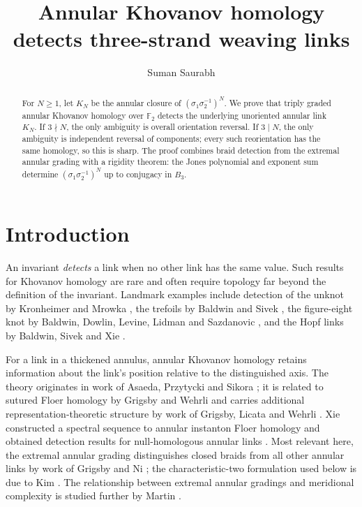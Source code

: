 \documentclass[11pt]{amsart}
\title[Annular Khovanov homology and weaving links]
{Annular Khovanov homology detects three-strand weaving links}
\author{Suman Saurabh}
\theoremstyle{remark}
\begin{document}
\begin{abstract}
For \(N\geq1\), let \(K_N\) be the annular closure of
\((\sigma_1\sigma_2^{-1})^N\).  We prove that triply graded annular Khovanov homology
over \(\mathbb F_2\) detects the underlying unoriented annular link \(K_N\).  If
\(3\nmid N\), the only ambiguity is overall orientation reversal.  If \(3\mid N\),
the only ambiguity is independent reversal of components; every such reorientation
has the same homology, so this is sharp.  The proof combines braid detection from the
extremal annular grading with a rigidity theorem: the Jones polynomial and exponent
sum determine \((\sigma_1\sigma_2^{-1})^N\) up to conjugacy in \(B_3\).
\end{abstract}

\maketitle

\section{Introduction}

An invariant \emph{detects} a link when no other link has the same value.  Such results
for Khovanov homology \cite{Khovanov} are rare and often require topology far beyond
the definition of the invariant.  Landmark examples include detection of the unknot
by Kronheimer and Mrowka \cite{KronheimerMrowka}, the trefoils by Baldwin and Sivek
\cite{BaldwinSivek}, the figure-eight knot by Baldwin, Dowlin, Levine, Lidman and
Sazdanovic \cite{BaldwinDowlinLevineLidmanSazdanovic}, and the Hopf links by Baldwin,
Sivek and Xie \cite{BaldwinSivekXie}.

For a link in a thickened annulus, annular Khovanov homology retains information about
the link's position relative to the distinguished axis.  The theory originates in work
of Asaeda, Przytycki and Sikora \cite{APS}; it is related to sutured Floer homology by
Grigsby and Wehrli \cite{GrigsbyWehrli} and carries additional representation-theoretic
structure by work of Grigsby, Licata and Wehrli \cite{GrigsbyLicataWehrli}.  Xie
constructed a spectral sequence to annular instanton Floer homology and obtained
detection results for null-homologous annular links \cite{Xie}.  Most relevant here,
the extremal annular grading distinguishes closed braids from all other annular links
by work of Grigsby and Ni \cite{GrigsbyNi}; the characteristic-two formulation used
below is due to Kim \cite{Kim}.  The relationship between extremal annular gradings and
meridional complexity is studied further by Martin \cite{Martin}.
\end{document}
